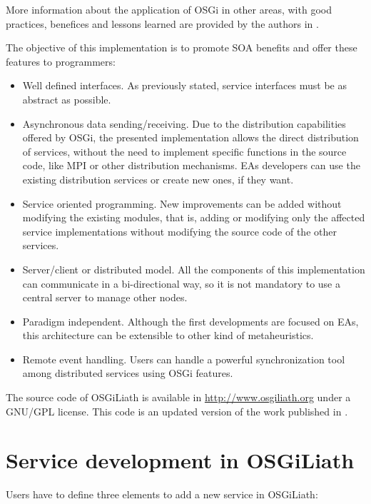 More information about the application of OSGi in other areas, with good practices, benefices and lessons learned are provided by the authors in \cite{GarciaSanchez2013Gateway}.

The objective of this implementation is to promote SOA benefits and offer  these features to programmers:


\begin{itemize}
\item Well defined interfaces. As previously stated, service interfaces must be as abstract as possible.
\item Asynchronous data sending/receiving. Due to the distribution capabilities offered by OSGi, the presented implementation allows the direct distribution of services, without the need to implement specific functions in the source code, like MPI or other distribution mechanisms. EAs developers can use the existing distribution services or create new ones, if they want.
\item Service oriented programming. New improvements can be added without modifying the existing modules, that is, adding or modifying only the affected service implementations without modifying the source code of the other services.
\item Server/client or distributed model. All the components of this implementation can communicate in a bi-directional way, so it is not mandatory to use a central server to manage other nodes.
\item Paradigm independent. Although the first developments are focused on EAs, this architecture can be extensible to other kind of metaheuristics.
\item Remote event handling. Users can handle a
  powerful synchronization tool among distributed services using OSGi features. 
                               
\end{itemize}

The source code of OSGiLiath is available in \url{http://www.osgiliath.org} under a GNU/GPL license. This code is an updated version of the work published in \cite{GarciaSanchezDistributed2010}. 

 
\section{Service development in OSGiLiath}

Users have to define three elements to add a new service in OSGiLiath:


